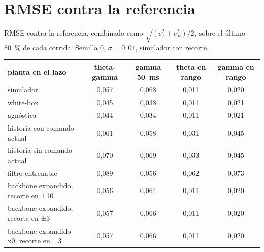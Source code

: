 \documentclass[10pt,a4paper]{article}
\begin{document}
\section{RMSE contra la referencia}

RMSE contra la referencia, combinado como $\sqrt{(e_I^2 + e_E^2)/2}$, sobre el último 80~\% de cada corrida. Semilla 0, $\sigma = 0{,}01$, simulador con recorte.

\begin{center}
\small
\begin{tabular}{@{}lcccc@{}}
\toprule
planta en el lazo & theta-gamma & gamma 50~ms & theta en rango & gamma en rango \\
\midrule
simulador & 0,057 & 0,068 & 0,011 & 0,020 \\
white-box & 0,045 & 0,038 & 0,011 & 0,021 \\
agnóstica & 0,044 & 0,034 & 0,011 & 0,021 \\
historia con comando actual & 0,061 & 0,058 & 0,031 & 0,045 \\
historia sin comando actual & 0,070 & 0,069 & 0,033 & 0,045 \\
filtro entrenable & 0,089 & 0,056 & 0,062 & 0,073 \\
backbone expandido, recorte en ±10 & 0,056 & 0,064 & 0,011 & 0,020 \\
backbone expandido, recorte en ±3 & 0,057 & 0,066 & 0,011 & 0,020 \\
backbone expandido x0, recorte en ±3 & 0,057 & 0,066 & 0,011 & 0,020 \\
\bottomrule
\end{tabular}
\end{center}
\end{document}

